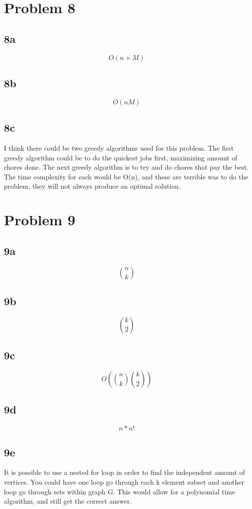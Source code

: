 \documentclass[letterpaper,oneside,10pt]{article}
\begin{document}
\section{Problem 8}
\label{sec:Problem 8}
\subsection{8a}
\label{sec:8a}
\begin{equation*}
O(n + M)
\end{equation*}
\subsection{8b}
\label{sec:8b}
\begin{equation*}
O(nM)
\end{equation*}
\subsection{8c}
\label{sec:8c}
\qquad I think there could be two greedy algorithms used for this problem.
The first greedy algorithm could be to do the quickest jobs first, maximizing
amount of chores done. The next greedy algorithm is to try and do chores that pay the 
best. The time complexity for each would be O(n), and these are terrible was to do the
problem, they will not always produce an optimal solution. 
\section{Problem 9}
\label{sec:Problem 9}
\subsection{9a}
\label{sec:9a}
\begin{equation*}
n \choose k
\end{equation*}
\subsection{9b}
\label{sec:9b}
\begin{equation*}
k \choose 2
\end{equation*}
\subsection{9c}
\label{sec:9c}
\begin{equation*}
O({n \choose k} {k \choose 2})
\end{equation*}
\subsection{9d}
\label{sec:9d}
\begin{equation*}
n*n!
\end{equation*}
\subsection{9e}
\label{sec:9e}
\qquad It is possible to use a nested for loop in order to find the 
independent amount of vertices. You could have one loop go through each k element subset and another loop go through sets within graph G. This would allow for a polynomial time algorithm, and still get the correct answer. 
\end{document}
